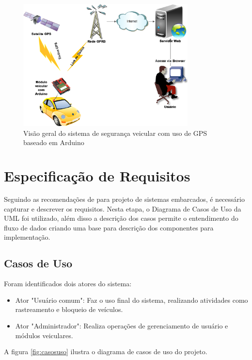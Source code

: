 \begin{figure}[!htb]
\centering
\includegraphics[width=0.8\textwidth]{figures/1_conceitual.png}
\caption{Visão geral do sistema de seguran\c{c}a veicular com uso de GPS baseado em Arduino}
\label{fig:visgeral}
\end{figure}

\section{Especificação de Requisitos}
Seguindo as recomendações de \textcite{Wolf:2001} para projeto de sistemas embarcados, é necessário
capturar e descrever os requisitos. Nesta etapa, o Diagrama de Casos de Uso da UML foi utilizado, além disso a descrição dos casos permite o entendimento do fluxo de dados criando uma base
para descrição dos componentes para implementação.

\subsection{Casos de Uso}

Foram identificados dois atores do sistema: 

\begin{itemize}
	\item Ator "Usuário comum": Faz o uso final do sistema, realizando atividades como rastreamento e bloqueio
	de veículos.
	\item Ator "Administrador": Realiza operações de gerenciamento de usuário e módulos veiculares.
\end{itemize}
  
A figura \ref{fig:casosuso} ilustra o diagrama de casos de uso do projeto.


